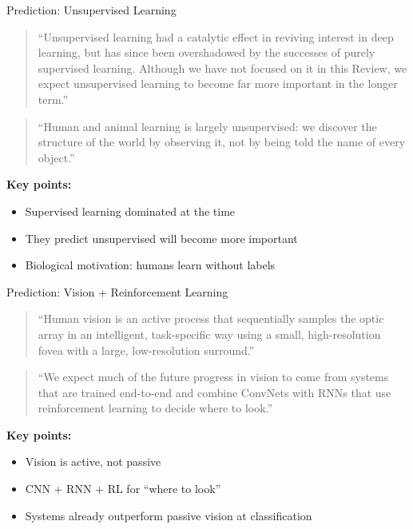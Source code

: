 \begin{frame}{Prediction: Unsupervised Learning}
    \begin{quote}
        ``Unsupervised learning had a catalytic effect in reviving interest in deep learning, but has since been overshadowed by the successes of purely supervised learning. Although we have not focused on it in this Review, we expect unsupervised learning to become far more important in the longer term.''
    \end{quote}
    
    \vspace{0.5em}
    \begin{quote}
        ``Human and animal learning is largely unsupervised: we discover the structure of the world by observing it, not by being told the name of every object.''
    \end{quote}
    
    \vspace{1em}
    \textbf{Key points:}
    \begin{itemize}
        \item Supervised learning dominated at the time
        \item They predict unsupervised will become more important
        \item Biological motivation: humans learn without labels
    \end{itemize}
\end{frame}

\begin{frame}{Prediction: Vision + Reinforcement Learning}
    \begin{quote}
        ``Human vision is an active process that sequentially samples the optic array in an intelligent, task-specific way using a small, high-resolution fovea with a large, low-resolution surround.''
    \end{quote}
    
    \vspace{0.5em}
    \begin{quote}
        ``We expect much of the future progress in vision to come from systems that are trained end-to-end and combine ConvNets with RNNs that use reinforcement learning to decide where to look.''
    \end{quote}
    
    \vspace{1em}
    \textbf{Key points:}
    \begin{itemize}
        \item Vision is active, not passive
        \item CNN + RNN + RL for ``where to look''
        \item Systems already outperform passive vision at classification
    \end{itemize}
\end{frame}

